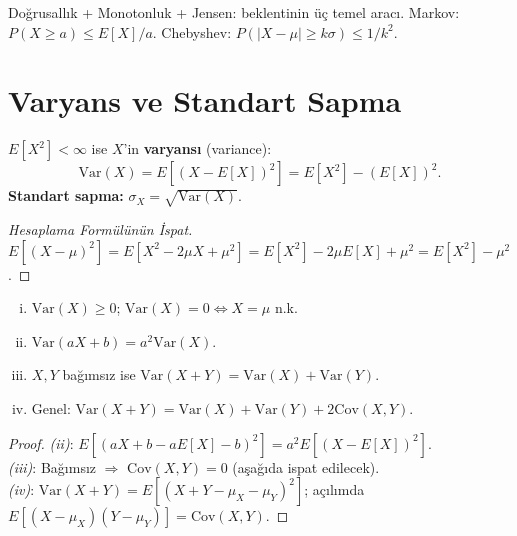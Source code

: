 \begin{mikroozet}
Doğrusallık + Monotonluk + Jensen: beklentinin üç temel aracı.
Markov: $P(X \geq a) \leq E[X]/a$. Chebyshev: $P(|X-\mu| \geq k\sigma) \leq 1/k^2$.
\end{mikroozet}

\section{Varyans ve Standart Sapma}
\label{sec:varyans}

\begin{tanim}
\label{def:varyans}
$E[X^2] < \infty$ ise $X$'in \textbf{varyansı} (variance):
\[
  \mathrm{Var}(X) = E[(X - E[X])^2] = E[X^2] - (E[X])^2.
\]
\textbf{Standart sapma:} $\sigma_X = \sqrt{\mathrm{Var}(X)}$.
\end{tanim}

\begin{proof}[Hesaplama Formülünün İspat]
$E[(X - \mu)^2] = E[X^2 - 2\mu X + \mu^2]
= E[X^2] - 2\mu E[X] + \mu^2 = E[X^2] - \mu^2$.
\end{proof}

\begin{onerme}
\label{prop:varyans_ozellik}
\begin{enumerate}[(i)]
  \item $\mathrm{Var}(X) \geq 0$; $\mathrm{Var}(X) = 0 \Leftrightarrow X = \mu$ n.k.
  \item $\mathrm{Var}(aX + b) = a^2 \mathrm{Var}(X)$.
  \item $X, Y$ bağımsız ise $\mathrm{Var}(X + Y) = \mathrm{Var}(X) + \mathrm{Var}(Y)$.
  \item Genel: $\mathrm{Var}(X + Y) = \mathrm{Var}(X) + \mathrm{Var}(Y) + 2\mathrm{Cov}(X, Y)$.
\end{enumerate}
\end{onerme}

\begin{proof}
\textit{(ii)}: $E[(aX+b-aE[X]-b)^2] = a^2 E[(X-E[X])^2]$.\\
\textit{(iii)}: Bağımsız $\Rightarrow$ $\mathrm{Cov}(X,Y) = 0$ (aşağıda ispat edilecek).\\
\textit{(iv)}: $\mathrm{Var}(X+Y) = E[(X+Y-\mu_X-\mu_Y)^2]$; açılımda $E[(X-\mu_X)(Y-\mu_Y)] = \mathrm{Cov}(X,Y)$.
\end{proof}

